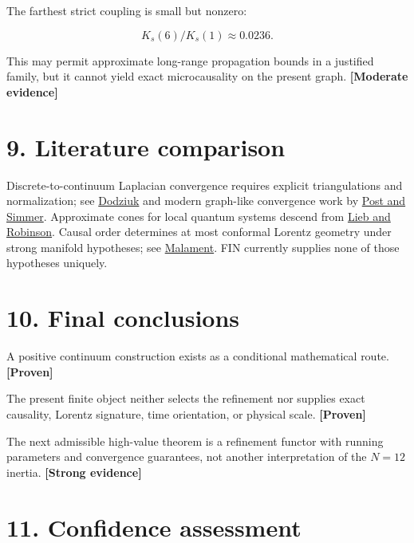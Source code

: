 \documentclass[11pt,a4paper,openany]{report}
\newcommand{\statusProven}{\textcolor{fingreen}{[Proven]}}
\newcommand{\statusStrong}{\textcolor{finblue}{[Strong evidence]}}
\newcommand{\statusModerate}{\textcolor{finviolet}{[Moderate evidence]}}
\begin{document}
The farthest strict coupling is small but nonzero:

\[
K_s(6)/K_s(1)\approx0.0236.
\]

This may permit approximate long-range propagation bounds in a justified family, but it cannot yield exact microcausality on the present graph. \textbf{\statusModerate{}}

\section{9. Literature comparison}

Discrete-to-continuum Laplacian convergence requires explicit triangulations and normalization; see \href{https://doi.org/10.2307/2373615}{Dodziuk} and modern graph-like convergence work by \href{https://arxiv.org/abs/1704.00064}{Post and Simmer}. Approximate cones for local quantum systems descend from \href{https://doi.org/10.1007/BF01645779}{Lieb and Robinson}. Causal order determines at most conformal Lorentz geometry under strong manifold hypotheses; see \href{https://doi.org/10.1063/1.523436}{Malament}. FIN currently supplies none of those hypotheses uniquely.

\section{10. Final conclusions}

A positive continuum construction exists as a conditional mathematical route. \textbf{\statusProven{}}

The present finite object neither selects the refinement nor supplies exact causality, Lorentz signature, time orientation, or physical scale. \textbf{\statusProven{}}

The next admissible high-value theorem is a refinement functor with running parameters and convergence guarantees, not another interpretation of the \(N=12\) inertia. \textbf{\statusStrong{}}

\section{11. Confidence assessment}
\end{document}
